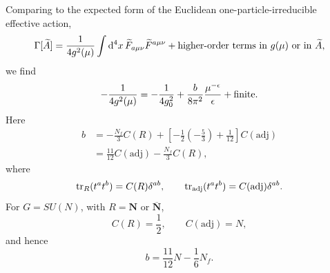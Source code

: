Comparing to the expected form of the Euclidean one-particle-irreducible
effective action,
\[
  \Gamma[\widetilde A]
  =
  \frac{1}{4g^2(\mu)}
  \int\mathrm{d}^4x\,\widetilde F_{a\mu\nu}\widetilde F^{a\mu\nu}
  +\hbox{higher-order terms in \(g(\mu)\) or in \(\widetilde A\)},
\]
we find
\[
  -\frac{1}{4g^2(\mu)}
  =
  -\frac{1}{4g_0^2}
  +\frac{b}{8\pi^2}\frac{\mu^{-\epsilon}}{\epsilon}
  +\hbox{finite}.
\]
Here
\[
\begin{aligned}
  b
  &=
  -\frac{N_f}{3}C(R)
  +\left[-\frac12\left(-\frac53\right)+\frac{1}{12}\right]
  C(\mathrm{adj})
\\
  &=
  \frac{11}{12}C(\mathrm{adj})
  -\frac{N_f}{3}C(R),
\end{aligned}
\]
where
\[
  \operatorname{tr}_{R}(t^at^b)=C(R)\delta^{ab},
  \qquad
  \operatorname{tr}_{\rm adj}(t^at^b)=C(\mathrm{adj})\delta^{ab}.
\]
For \(G=SU(N)\), with \(R=\mathbf N\) or \(\overline{\mathbf N}\),
\[
  C(R)=\frac12,\qquad C(\mathrm{adj})=N,
\]
and hence
\[
  b=\frac{11}{12}N-\frac16N_f.
\]

